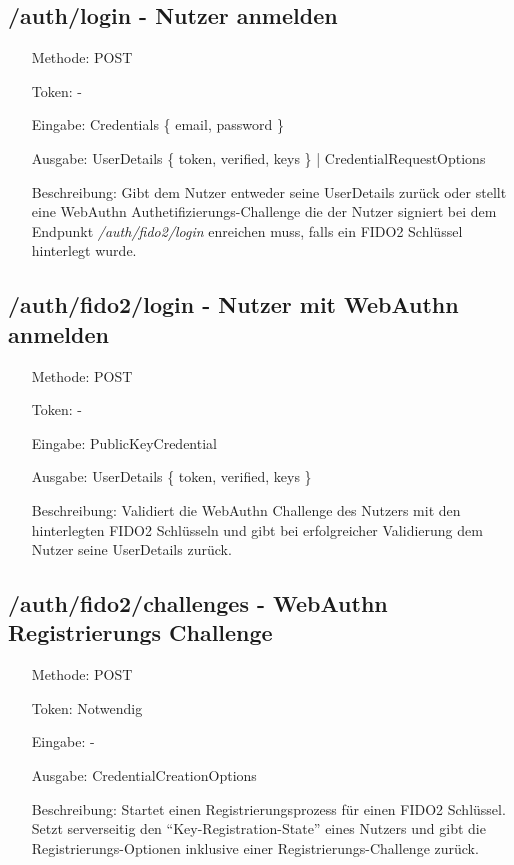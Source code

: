 \documentclass[journal]{IEEEtran}
\begin{document}
\subsection{/auth/login - Nutzer anmelden}

\begin{itemize}
	\setlength{\leftskip}{1.5cm}
	\setlength{\itemsep}{0pt}
	\item[Methode:] POST
	\item[Token:] -
	\item[Eingabe:] Credentials \{ email, password \}
	\item[Ausgabe:] UserDetails \{ token, verified, keys \} |
		CredentialRequestOptions 
	\item[Beschreibung:] Gibt dem Nutzer entweder seine UserDetails zurück oder
		stellt eine WebAuthn Authetifizierungs-Challenge die der Nutzer
		signiert bei dem Endpunkt \textit{/auth/fido2/login} enreichen muss,
		falls ein FIDO2 Schlüssel hinterlegt wurde.
\end{itemize}

\subsection{/auth/fido2/login - Nutzer mit WebAuthn anmelden}

\begin{itemize}
	\setlength{\leftskip}{1.5cm}
	\setlength{\itemsep}{0pt}
	\item[Methode:] POST
	\item[Token:] -
	\item[Eingabe:] PublicKeyCredential
	\item[Ausgabe:] UserDetails \{ token, verified, keys \}
	\item[Beschreibung:] Validiert die WebAuthn Challenge des Nutzers mit den
		hinterlegten FIDO2 Schlüsseln und gibt bei erfolgreicher Validierung
		dem Nutzer seine UserDetails zurück.
\end{itemize}

\subsection{/auth/fido2/challenges - WebAuthn Registrierungs Challenge}

\begin{itemize}
	\setlength{\leftskip}{1.5cm}
	\setlength{\itemsep}{0pt}
	\item[Methode:] POST
	\item[Token:] Notwendig
	\item[Eingabe:] -
	\item[Ausgabe:] CredentialCreationOptions 
	\item[Beschreibung:] Startet einen Registrierungsprozess für einen FIDO2
		Schlüssel. Setzt serverseitig den ``Key-Registration-State'' eines
		Nutzers und gibt die Registrierungs-Optionen inklusive einer
		Registrierungs-Challenge zurück.
\end{itemize}
\end{document}
